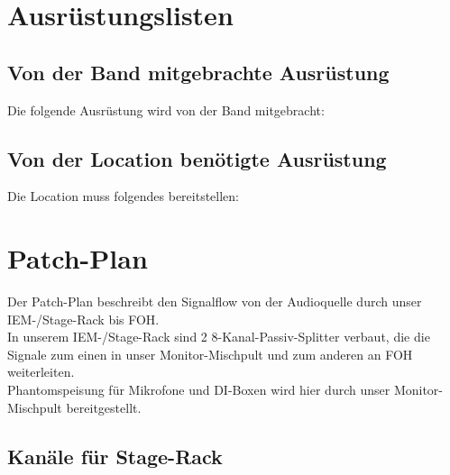 \documentclass[standard]{techrider}  %
\begin{document}
\maketitle


\section{Ausrüstungslisten}

\subsection{Von der Band mitgebrachte Ausrüstung}

Die folgende Ausrüstung wird von der Band mitgebracht:

\bandEquipmentTable

\subsection{Von der Location benötigte Ausrüstung}  

Die Location muss folgendes bereitstellen:

\venueRequirementsTable


\section{Patch-Plan}

Der Patch-Plan beschreibt den Signalflow von der Audioquelle durch unser IEM-/Stage-Rack bis FOH. \\
In unserem IEM-/Stage-Rack sind 2 8-Kanal-Passiv-Splitter verbaut, die die Signale zum einen in unser Monitor-Mischpult und zum anderen an FOH weiterleiten. \\
Phantomspeisung für Mikrofone und DI-Boxen wird hier durch unser Monitor-Mischpult bereitgestellt.

\subsection{Kanäle für Stage-Rack}
\end{document}
